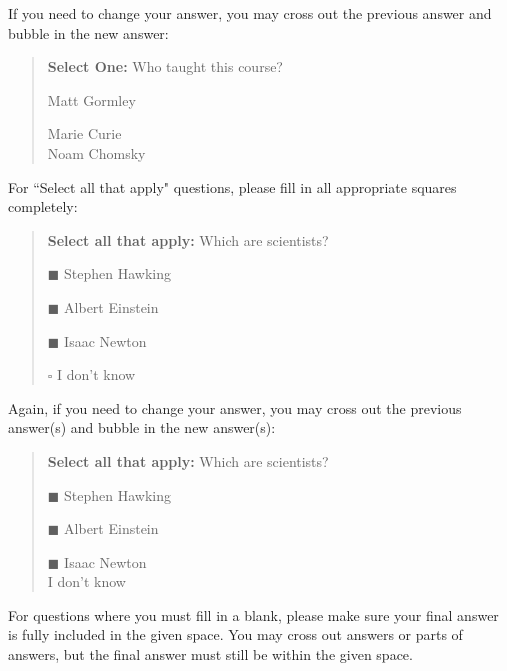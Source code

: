 \documentclass[12pt]{article}
\begin{document}
If you need to change your answer, you may cross out the previous answer and bubble in the new answer:

\begin{quote}
\textbf{Select One:} Who taught this course?
\begin{list}{}
     \item\CIRCLE{} Matt Gormley
     \item\Circle{} Marie Curie\\
     \xcancel{\CIRCLE}{} Noam Chomsky
\end{list}
\end{quote}


For ``Select all that apply" questions, please fill in all appropriate squares completely:

\begin{quote}
\textbf{Select all that apply:} Which are scientists?
    \begin{list}{}
    \item $\blacksquare$ Stephen Hawking 
    \item $\blacksquare$ Albert Einstein
    \item $\blacksquare$ Isaac Newton
    \item $\square$ I don't know
\end{list}
\end{quote}

Again, if you need to change your answer, you may cross out the previous answer(s) and bubble in the new answer(s):

\begin{quote}
\textbf{Select all that apply:} Which are scientists?
    \begin{list}{}
    \item $\blacksquare$ Stephen Hawking 
    \item $\blacksquare$ Albert Einstein
    \item $\blacksquare$ Isaac Newton\\
    \xcancel{$\blacksquare$} I don't know
\end{list}
\end{quote}

For questions where you must fill in a blank, please make sure your final answer is fully included in the given space. You may cross out answers or parts of answers, but the final answer must still be within the given space.
\end{document}
